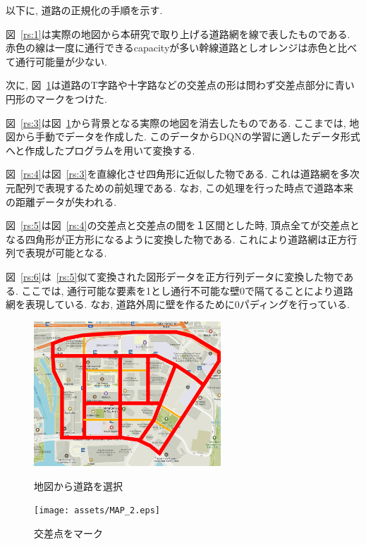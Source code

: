 以下に, 道路の正規化の手順を示す.

図~\ref{rs:1}は実際の地図から本研究で取り上げる道路網を線で表したものである. 赤色の線は一度に通行できるcapacityが多い幹線道路としオレンジは赤色と比べて通行可能量が少ない.

次に, 図~\ref{rs:2}は道路のT字路や十字路などの交差点の形は問わず交差点部分に青い円形のマークをつけた. 

図~\ref{rs:3}は図~\ref{rs:2}から背景となる実際の地図を消去したものである. ここまでは, 地図から手動でデータを作成した. このデータからDQNの学習に適したデータ形式へと作成したプログラムを用いて変換する.

図~\ref{rs:4}は図~\ref{rs:3}を直線化させ四角形に近似した物である. これは道路網を多次元配列で表現するための前処理である. なお, この処理を行った時点で道路本来の距離データが失われる.

図~\ref{rs:5}は図~\ref{rs:4}の交差点と交差点の間を１区間とした時, 頂点全てが交差点となる四角形が正方形になるように変換した物である. これにより道路網は正方行列で表現が可能となる.

図~\ref{rs:6}は~\ref{rs:5}似て変換された図形データを正方行列データに変換した物である. ここでは, 通行可能な要素を1とし通行不可能な壁0で隔てることにより道路網を表現している.
なお, 道路外周に壁を作るために0パディングを行っている.

\begin{figure}[htbp]
    \begin{minipage}{0.5\hsize}
        \begin{center}
            \includegraphics[width=70mm]{assets/MAP_1.eps}
        \end{center}
        \caption{地図から道路を選択}
        \label{rs:1}
    \end{minipage}
    \begin{minipage}{0.5\hsize}
        \begin{center}
            \texttt{[image: assets/MAP\_2.eps]}
        \end{center}
        \caption{交差点をマーク}
        \label{rs:2}
    \end{minipage}
\end{figure}



